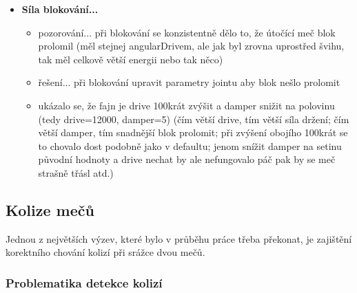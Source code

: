 \begin{itemize}
\begin{itemize}
      \end{itemize}
  \item \textbf{Síla blokování...}
    \begin{itemize}
      \item pozorování... při blokování se konzistentně dělo to, že útočící meč blok prolomil (měl stejnej angularDrivem, ale jak byl zrovna uprostřed švihu, tak měl celkově větší energii nebo tak něco)
      \item řešení... při blokování upravit parametry jointu aby blok nešlo prolomit
      \item ukázalo se, že fajn je drive 100krát zvýšit a damper snižit na polovinu (tedy drive=12000, damper=5) (čím větší drive, tím větší síla držení; čím větší damper, tím snadnější blok prolomit; při zvýšení obojího 100krát se to chovalo dost podobně jako v defaultu; jenom snížit damper na setinu původní hodnoty a drive nechat by ale nefungovalo páč pak by se meč strašně třásl atd.)
    \end{itemize}
\end{itemize}




\pagebreak

\subsection{Kolize mečů} \label{swordCollisionsSection}

Jednou z největších výzev, které bylo v průběhu práce třeba překonat, je zajištění korektního chování kolizí při srážce dvou mečů.


\subsubsection*{Problematika detekce kolizí}

